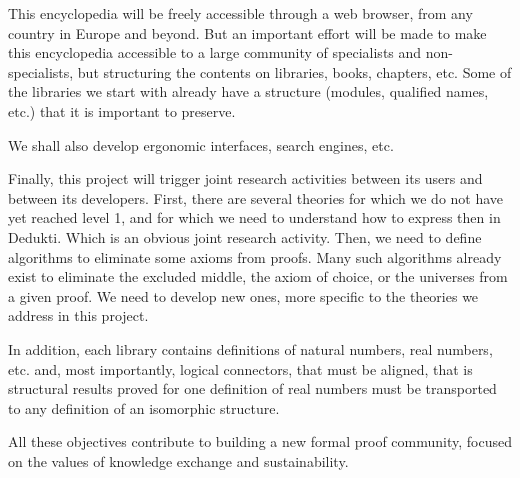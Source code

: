 This encyclopedia will be freely accessible through a web browser,
from any country in Europe and beyond. But an important effort will be
made to make this encyclopedia accessible to a large community of
specialists and non-specialists, but structuring the contents on
libraries, books, chapters, etc. Some of the libraries we start with
already have a structure (modules, qualified names, etc.) that it is
important to preserve.

We shall also develop ergonomic interfaces, search engines, etc. 


Finally, this project will trigger joint research activities between
its users and between its developers.  First, there are several
theories for which we do not have yet reached level 1, and for which
we need to understand how to express then in {\textsf Dedukti}. Which is
an obvious joint research activity. Then, we need to define algorithms
to eliminate some axioms from proofs. Many such algorithms already
exist to eliminate the excluded middle, the axiom of choice, or the universes
from a given proof. We need to develop new ones, more specific to the theories
we address in this project.

In addition, each library contains definitions of natural numbers,
real numbers, etc. and, most importantly, logical connectors, that
must be aligned, that is structural results proved for one definition
of real numbers must be transported to any definition of an isomorphic
structure.

All these objectives contribute to building a new formal proof
community, focused on the values of knowledge exchange and
sustainability.


